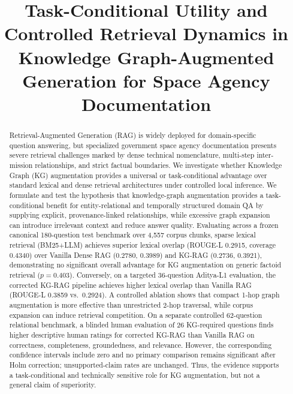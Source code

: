 \documentclass[conference]{IEEEtran}
\begin{document}
\title{Task-Conditional Utility and Controlled Retrieval Dynamics in Knowledge Graph-Augmented Generation for Space Agency Documentation}

\author{
\and
{}
}

\maketitle

\begin{abstract}
Retrieval-Augmented Generation (RAG) is widely deployed for domain-specific question answering, but specialized government space agency documentation presents severe retrieval challenges marked by dense technical nomenclature, multi-step inter-mission relationships, and strict factual boundaries. We investigate whether Knowledge Graph (KG) augmentation provides a universal or task-conditional advantage over standard lexical and dense retrieval architectures under controlled local inference. We formulate and test the hypothesis that knowledge-graph augmentation provides a task-conditional benefit for entity-relational and temporally structured domain QA by supplying explicit, provenance-linked relationships, while excessive graph expansion can introduce irrelevant context and reduce answer quality. Evaluating across a frozen canonical 180-question test benchmark over 4,557 corpus chunks, sparse lexical retrieval (BM25+LLM) achieves superior lexical overlap (ROUGE-L 0.2915, coverage 0.4340) over Vanilla Dense RAG (0.2780, 0.3989) and KG-RAG (0.2736, 0.3921), demonstrating no significant overall advantage for KG augmentation on generic factoid retrieval ($p=0.403$). Conversely, on a targeted 36-question Aditya-L1 evaluation, the corrected KG-RAG pipeline achieves higher lexical overlap than Vanilla RAG (ROUGE-L 0.3859 vs.\ 0.2924). A controlled ablation shows that compact 1-hop graph augmentation is more effective than unrestricted 2-hop traversal, while corpus expansion can induce retrieval competition. On a separate controlled 62-question relational benchmark, a blinded human evaluation of 26 KG-required questions finds higher descriptive human ratings for corrected KG-RAG than Vanilla RAG on correctness, completeness, groundedness, and relevance. However, the corresponding confidence intervals include zero and no primary comparison remains significant after Holm correction; unsupported-claim rates are unchanged. Thus, the evidence supports a task-conditional and technically sensitive role for KG augmentation, but not a general claim of superiority.
\end{abstract}
\end{document}
